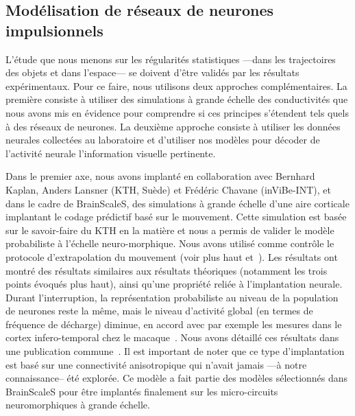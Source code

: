 \subsection{Modélisation de réseaux de neurones impulsionnels}%
\label{sec:spikes}
L'étude que nous menons sur les régularités statistiques ---dans les trajectoires des objets et dans l'espace--- se doivent d'être validés par les résultats expérimentaux. Pour ce faire, nous utilisons deux approches complémentaires. La première consiste à utiliser des simulations à grande échelle des conductivités que nous avons mis en évidence pour comprendre si ces principes s'étendent tels quels à des réseaux de neurones. La deuxième approche consiste à utiliser les données neurales collectées au laboratoire et d'utiliser nos modèles pour décoder de l'activité neurale l'information visuelle pertinente.

Dans le premier axe, nous avons implanté en collaboration avec Bernhard Kaplan, Anders Lansner (KTH, Suède) et Frédéric Chavane (inViBe-INT), et dans le cadre de BrainScaleS, des simulations à grande échelle d'une aire corticale implantant le codage prédictif basé sur le mouvement. Cette simulation est basée sur le savoir-faire du KTH en la matière et nous a permis de valider le modèle probabiliste à l'échelle neuro-morphique. Nous avons utilisé comme contrôle le protocole d'extrapolation du mouvement (voir plus haut et~\citep{Khoei13jpp}). Les résultats ont montré des résultats similaires aux résultats théoriques (notamment les trois points évoqués plus haut), ainsi qu'une propriété reliée à l'implantation neurale. Durant l'interruption, la représentation probabiliste au niveau de la population de neurones reste la même, mais le niveau d'activité global (en termes de fréquence de décharge) diminue, en accord avec par exemple les mesures dans le cortex infero-temporal chez le macaque~\citep{Assad95}. Nous avons détaillé ces résultats dans une publication commune~\citep{KaplanKhoei14}. Il est important de noter que ce type d'implantation est basé sur une connectivité anisotropique qui n'avait jamais ---à notre connaissance-- été explorée. Ce modèle a fait partie des modèles sélectionnés dans BrainScaleS pour être implantés finalement sur les micro-circuits neuromorphiques à grande échelle.

